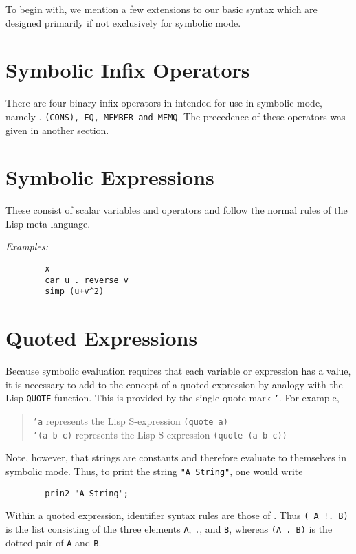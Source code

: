 To begin with, we mention a few extensions to our basic syntax which are
designed primarily if not exclusively for symbolic mode.

\section{Symbolic Infix Operators}

There are four binary infix operators in {\REDUCE} intended for use in
symbolic mode, namely . {\tt (CONS), EQ, MEMBER and MEMQ}. The precedence of
these operators was given in another section.

\section{Symbolic Expressions}

These consist of scalar variables and operators and follow the normal
rules of the Lisp meta language.

{\it Examples:}
\begin{verbatim}
        x
        car u . reverse v
        simp (u+v^2)
\end{verbatim}

\section{Quoted Expressions} 

Because symbolic evaluation requires that each variable or expression has a
value, it is necessary to add to {\REDUCE} the concept of a quoted expression
by analogy with the Lisp {\tt QUOTE} function. This is provided by the single
quote mark {\tt '}.  For example,
\begin{quote}
\begin{tabbing}
{\tt 'a} \hspace{0.5in} \= represents the Lisp S-expression \hspace{0.2 in} \=
{\tt (quote a)} \\
{\tt '(a b c)} \> represents the Lisp S-expression \> {\tt (quote (a b c))}
\end{tabbing}
\end{quote}
Note, however, that strings are constants and therefore evaluate to
themselves in symbolic mode. Thus, to print the string {\tt "A String"}, one
would write
\begin{verbatim}
        prin2 "A String";
\end{verbatim}
Within a quoted expression, identifier syntax rules are those of {\REDUCE}.
Thus {\tt ( A !.  B)} is the list consisting of the three elements {\tt A},
{\tt .}, and {\tt B}, whereas {\tt (A .  B)} is the dotted pair of {\tt A}
and {\tt B}.

